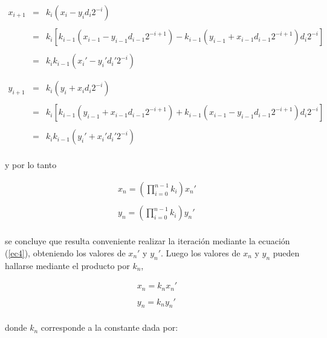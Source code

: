 \begin{equation}
\begin{array}{lll}
x_{i+1} & = & k_{i}\left(x_{i}-y_{i}d_{i}2^{-i}\right)\\
\\
        & = & k_{i}\left[ k_{i-1}\left(x_{i-1}-y_{i-1}d_{i-1}2^{-i+1}\right) - k_{i-1}\left(y_{i-1}+
x_{i-1}d_{i-1}2^{-i+1}\right)d_{i} 2^{-i} \right]\\
\\
        & = & k_{i}k_{i-1}\left(x_{i}'-y_{i}'d_{i}'2^{-i}\right)\\
\\
\\
y_{i+1} & = & k_{i}\left(y_{i}+x_{i}d_{i}2^{-i}\right)\\
\\
        & = & k_{i}\left[ k_{i-1}\left(y_{i-1}+x_{i-1}d_{i-1}2^{-i+1}\right) +
 k_{i-1}\left(x_{i-1}-y_{i-1}d_{i-1}2^{-i+1}\right)d_{i} 2^{-i} \right]\\
\\
        & = & k_{i}k_{i-1}\left(y_{i}'+x_{i}'d_{i}'2^{-i}\right)\\
\end{array}
\end{equation}

y por lo tanto

\begin{equation}
\begin{array}{l}
x_{n}=\left(\prod_{i=0}^{n-1}k_{i}\right)x_{n}'\\
\\
y_{n}=\left(\prod_{i=0}^{n-1}k_{i}\right)y_{n}'\\
\end{array}
\end{equation}

se concluye que resulta conveniente realizar la iteración mediante la ecuación (\ref{ec4}), obteniendo los valores de
$x_{n}'$ y $y_{n}'$. Luego los valores de $x_{n}$ y $y_{n}$ pueden hallarse mediante el producto por $k_{n}$,

\begin{equation}
\begin{array}{l}
x_{n}=k_{n} x_{n}'\\
\\
y_{n}=k_{n} y_{n}'\\
\end{array}
\end{equation}

donde $k_{n}$ corresponde a la constante dada por:

